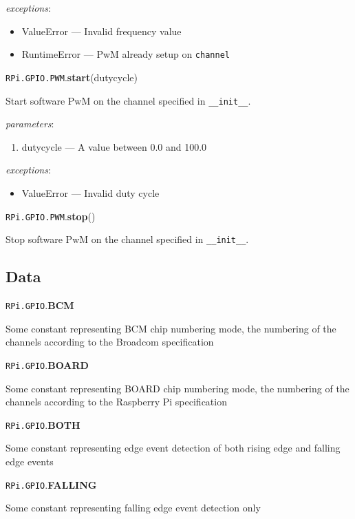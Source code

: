 \documentclass[12pt]{article}
\begin{document}
 
\textit{exceptions}:
\begin{itemize}
    \item ValueError --- Invalid frequency value
    \item RuntimeError --- PwM already setup on \texttt{channel}
\end{itemize}

\noindent \texttt{RPi.GPIO.PWM}.\textbf{start}(dutycycle)
        
Start software PwM on the channel specified in \texttt{\_\_init\_\_}.

\textit{parameters}:
\begin{enumerate}      
        \item dutycycle --- A value between 0.0 and 100.0
\end{enumerate}
 
 
\textit{exceptions}:
\begin{itemize}
    \item ValueError --- Invalid duty cycle
\end{itemize}

\noindent \texttt{RPi.GPIO.PWM}.\textbf{stop}()
        
Stop software PwM on the channel specified in \texttt{\_\_init\_\_}.

\medskip \medskip

\subsection{Data}

\noindent \texttt{RPi.GPIO}.\textbf{BCM}

Some constant representing BCM chip numbering mode, the numbering of the channels according to the Broadcom specification

\noindent \texttt{RPi.GPIO}.\textbf{BOARD}

Some constant representing BOARD chip numbering mode, the numbering of the channels according to the Raspberry Pi specification

\noindent \texttt{RPi.GPIO}.\textbf{BOTH}

Some constant representing edge event detection of both rising edge and falling edge events

\noindent \texttt{RPi.GPIO}.\textbf{FALLING}

Some constant representing falling edge event detection only
\end{document}
